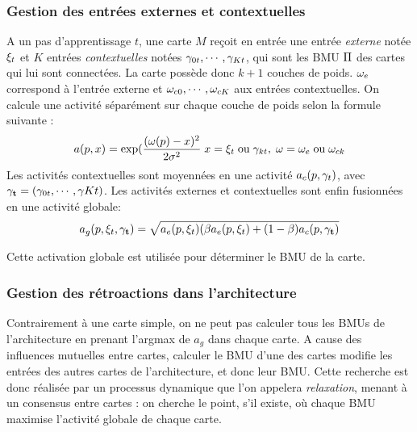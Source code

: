 \subsubsection{Gestion des entrées externes et contextuelles}

A un pas d'apprentissage $t$, une carte $M$ reçoit en entrée une entrée \emph{externe} notée $\xi_t$ et $K$ entrées \emph{contextuelles} notées $\gamma_{0t},\cdots,\gamma_{Kt}$, qui sont les BMU $\Pi$ des cartes qui lui sont connectées. La carte possède donc $k+1$ couches de poids. $\omega_e$ correspond à l'entrée externe et $\omega_{c0}, \cdots, \omega_{cK}$ aux entrées contextuelles. On calcule une activité séparément sur chaque couche de poids selon la formule suivante : 
\begin{equation}
\label{eq:activite}
a(p,x) = \exp(\frac{(\omega(p)-x)^2}{2\sigma^2} \; x = \xi_t\; \text{ou}\; \gamma_{kt}, \; \omega = \omega_e \;\text{ou}\; \omega_{ck}
\end{equation}
Les activités contextuelles sont moyennées en une activité $a_c(p,\mathbf{\gamma}_t)$, avec $\mathbf{\gamma_t} = (\gamma_{0t}, \cdots, \gamma{Kt})$. 
Les activités externes et contextuelles sont enfin fusionnées en une activité globale:
\begin{equation}
\label{eq:global_act}
a_g(p,\xi_t,\mathbf{\gamma_t}) = \sqrt{a_e(p,\xi_t)(\beta a_e(p,\xi_t) + (1-\beta) a_c(p, \mathbf{\gamma_t})}
\end{equation}

Cette activation globale est utilisée pour déterminer le BMU de la carte. 

\subsubsection{Gestion des rétroactions dans l'architecture}

Contrairement à une carte simple, on ne peut pas calculer tous les BMUs de l'architecture en prenant l'argmax de $a_g$ dans chaque carte. A cause des influences mutuelles entre cartes, calculer le BMU d'une des cartes modifie les entrées des autres cartes de l'architecture, et donc leur BMU. Cette recherche est donc réalisée par un processus dynamique que l'on appelera \emph{relaxation}, menant à un consensus entre cartes : on cherche le point, s'il existe, où chaque BMU maximise l'activité globale de chaque carte.

